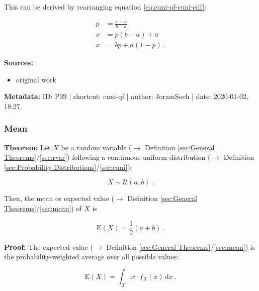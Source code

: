 \documentclass[a4paper,12pt,twoside]{book}
\begin{document}
This can be derived by rearranging equation \eqref{eq:cuni-qf-cuni-cdf}:

\begin{equation} \label{eq:cuni-qf-cuni-cdf-s2}
\begin{split}
p &= \frac{x-a}{b-a} \\
x &= p(b-a) + a \\
x &= bp + a(1-p) \; .
\end{split}
\end{equation}


\vspace{1em}
\textbf{Sources:}
\begin{itemize}
\item original work\end{itemize}


\vspace{1em}
\textbf{Metadata:} ID: P39 | shortcut: cuni-qf | author: JoramSoch | date: 2020-01-02, 18:27.
\vspace{1em}



\subsubsection[\textbf{Mean}]{Mean} \label{sec:cuni-mean}
\setcounter{equation}{0}

\textbf{Theorem:} Let $X$ be a random variable ($\rightarrow$ Definition \ref{sec:General Theorems}/\ref{sec:rvar}) following a continuous uniform distribution ($\rightarrow$ Definition \ref{sec:Probability Distributions}/\ref{sec:cuni}):

\begin{equation} \label{eq:cuni-mean-cuni}
X \sim \mathcal{U}(a, b) \; .
\end{equation}

Then, the mean or expected value ($\rightarrow$ Definition \ref{sec:General Theorems}/\ref{sec:mean}) of $X$ is

\begin{equation} \label{eq:cuni-mean-cuni-mean}
\mathrm{E}(X) = \frac{1}{2} (a+b) \; .
\end{equation}


\vspace{1em}
\textbf{Proof:} The expected value ($\rightarrow$ Definition \ref{sec:General Theorems}/\ref{sec:mean}) is the probability-weighted average over all possible values:

\begin{equation} \label{eq:cuni-mean-mean}
\mathrm{E}(X) = \int_{\mathcal{X}} x \cdot f_X(x) \, \mathrm{d}x \; .
\end{equation}
\end{document}
